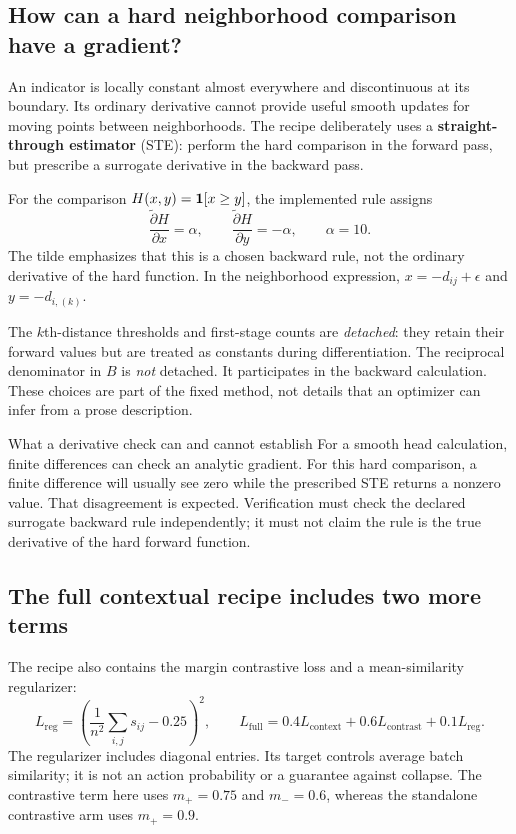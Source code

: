 \subsection{How can a hard neighborhood comparison have a gradient?}
An indicator is locally constant almost everywhere and discontinuous at its
boundary. Its ordinary derivative cannot provide useful smooth updates for
moving points between neighborhoods. The recipe deliberately uses a
\textbf{straight-through estimator} (STE): perform the hard comparison in the
forward pass, but prescribe a surrogate derivative in the backward pass.

For the comparison $H(x,y)=\mathbf{1}[x\ge y]$, the implemented rule assigns
\[
 \frac{\widetilde{\partial}H}{\partial x}=\alpha,\qquad
 \frac{\widetilde{\partial}H}{\partial y}=-\alpha,\qquad \alpha=10.
\]
The tilde emphasizes that this is a chosen backward rule, not the ordinary
derivative of the hard function. In the neighborhood expression, $x=-d_{ij}
+\epsilon$ and $y=-d_{i,(k)}$.

The $k$th-distance thresholds and first-stage counts are \emph{detached}: they
retain their forward values but are treated as constants during differentiation.
The reciprocal denominator in $B$ is \emph{not} detached. It participates in the
backward calculation. These choices are part of the fixed method, not details
that an optimizer can infer from a prose description.

\begin{caution}{What a derivative check can and cannot establish}
For a smooth head calculation, finite differences can check an analytic
gradient. For this hard comparison, a finite difference will usually see zero
while the prescribed STE returns a nonzero value. That disagreement is expected.
Verification must check the declared surrogate backward rule independently;
it must not claim the rule is the true derivative of the hard forward function.
\end{caution}

\subsection{The full contextual recipe includes two more terms}
The recipe also contains the margin contrastive loss and a mean-similarity
regularizer:
\[
 L_{\mathrm{reg}}=
 \left(\frac1{n^2}\sum_{i,j}s_{ij}-0.25\right)^2,
 \qquad
 L_{\mathrm{full}}=0.4L_{\mathrm{context}}
                  +0.6L_{\mathrm{contrast}}+0.1L_{\mathrm{reg}}.
\]
The regularizer includes diagonal entries. Its target controls average batch
similarity; it is not an action probability or a guarantee against collapse.
The contrastive term here uses $m_+=0.75$ and $m_-=0.6$, whereas the standalone
contrastive arm uses $m_+=0.9$.


